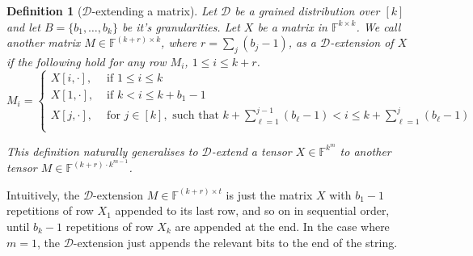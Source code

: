 \documentclass[11pt]{article}
\newtheorem{definition}{Definition}[section]
\newcommand{\F}{\mathbb{F}}
\newcommand{\sD}{\mathcal{D}}
\begin{document}
\begin{definition}[$\sD$-extending a matrix]
    \label{def:extend_matrix}
    Let $\sD$ be a grained distribution over $[k]$ and let $B = \{b_1, \dots, b_k\}$ be it's granularities. Let $X$ be a matrix in $\F^{k \times k}$. We call another matrix $M \in \F^{(k+r) \times k}$, where $r = \sum_j (b_j-1)$, as a $\sD$-extension of $X$ if the following hold for any row $M_i$, $1 \leq i \leq k+r$.   
    \begin{equation}
        M_i = 
        \begin{cases}
            X[i,\cdot], & \text{ if } 1 \leq i \leq k \\
            X[1,\cdot], & \text{ if } k < i \leq k+b_1-1 \\
            X[j,\cdot], & \text{ for } j \in [k], \text{ such that } k + \sum_{\ell = 1}^{j-1} (b_\ell-1) < i \leq k + \sum_{\ell = 1}^j (b_\ell-1) \\
        \end{cases}
    \end{equation}

    This definition naturally generalises to $\sD$-extend a tensor $X \in \F^{k^m}$ to another tensor $M \in \F^{(k+r) \cdot k^{m-1}}$.
\end{definition}
Intuitively, the $\sD$-extension $M \in \F^{(k+r) \times t}$ is just the matrix $X$ with $b_1-1$ repetitions of row $X_1$ appended to its last row, and so on in sequential order, until $b_k-1$ repetitions of row $X_k$ are appended at the end. In the case where $m=1$, the $\sD$-extension just appends the relevant bits to the end of the string.
\end{document}
